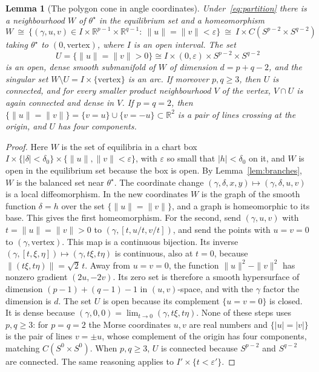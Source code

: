 \documentclass[11pt,a4paper]{article}
\newtheorem{lemma}[theorem]{Lemma}
\theoremstyle{definition}\newtheorem{conjecture}{Conjecture}
\theoremstyle{remark}\newtheorem{remark}[theorem]{Remark}
\newcommand{\R}{\mathbb R}
\begin{document}
\begin{lemma}[The polygon cone in angle coordinates]\label{lem:cone}
Under~\eqref{eq:partition} there is a neighbourhood $W$ of $\theta^\star$ in the equilibrium set and a homeomorphism
\begin{equation}\label{eq:cone}
 W\ \cong\ \{(\gamma,u,v)\in I\times\R^{p-1}\times\R^{q-1}:\ \|u\|=\|v\|<\varepsilon\}\ \cong\ I\times C(S^{p-2}\times S^{q-2})
\end{equation}
taking $\theta^\star$ to $(0,\text{vertex})$, where $I$ is an open interval. The set
\begin{equation}\label{eq:regular}
 U=\{\|u\|=\|v\|>0\}\cong I\times(0,\varepsilon)\times S^{p-2}\times S^{q-2}
\end{equation}
is an open, dense smooth submanifold of $W$ of dimension $d=p+q-2$, and the singular set $W\setminus U=I\times\{\text{vertex}\}$ is an arc. If moreover $p,q\ge3$, then $U$ is connected, and for every smaller product neighbourhood $V$ of the vertex, $V\cap U$ is again connected and dense in $V$. If $p=q=2$, then $\{\|u\|=\|v\|\}=\{v=u\}\cup\{v=-u\}\subset\R^2$ is a pair of lines crossing at the origin, and $U$ has four components.
\end{lemma}
\begin{proof}
Here $W$ is the set of equilibria in a chart box $I\times\{|\delta|<\delta_0\}\times\{\|u\|,\|v\|<\varepsilon\}$, with $\varepsilon$ so small that $|h|<\delta_0$ on it, and $W$ is open in the equilibrium set because the box is open. By Lemma~\ref{lem:branches}, $W$ is the balanced set near $\theta^\star$. The coordinate change $(\gamma,\delta,x,y)\mapsto(\gamma,\delta,u,v)$ is a local diffeomorphism. In the new coordinates $W$ is the graph of the smooth function $\delta=h$ over the set $\{\|u\|=\|v\|\}$, and a graph is homeomorphic to its base. This gives the first homeomorphism. For the second, send $(\gamma,u,v)$ with $t=\|u\|=\|v\|>0$ to $(\gamma,[t,u/t,v/t])$, and send the points with $u=v=0$ to $(\gamma,\text{vertex})$. This map is a continuous bijection. Its inverse $(\gamma,[t,\xi,\eta])\mapsto(\gamma,t\xi,t\eta)$ is continuous, also at $t=0$, because $\|(t\xi,t\eta)\|=\sqrt2\,t$. Away from $u=v=0$, the function $\|u\|^2-\|v\|^2$ has nonzero gradient $(2u,-2v)$. Its zero set is therefore a smooth hypersurface of dimension $(p-1)+(q-1)-1$ in $(u,v)$-space, and with the $\gamma$ factor the dimension is $d$. The set $U$ is open because its complement $\{u=v=0\}$ is closed. It is dense because $(\gamma,0,0)=\lim_{t\to0}(\gamma,t\xi,t\eta)$. None of these steps uses $p,q\ge3$: for $p=q=2$ the Morse coordinates $u,v$ are real numbers and $\{|u|=|v|\}$ is the pair of lines $v=\pm u$, whose complement of the origin has four components, matching $C(S^0\times S^0)$. When $p,q\ge3$, $U$ is connected because $S^{p-2}$ and $S^{q-2}$ are connected. The same reasoning applies to $I'\times\{t<\varepsilon'\}$.
\end{proof}
\end{document}
